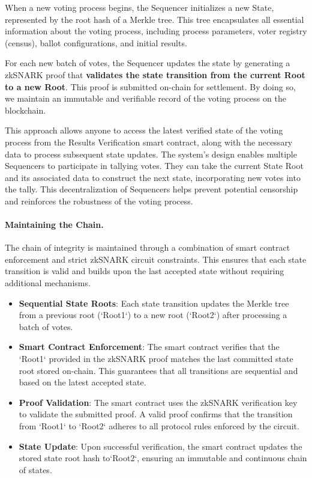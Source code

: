 When a new voting process begins, the Sequencer initializes a new State, represented by the root hash of a Merkle tree. This tree encapsulates all essential information about the voting process, including process parameters, voter registry (census), ballot configurations, and initial results.

For each new batch of votes, the Sequencer updates the state by generating a zkSNARK proof that \textbf{validates the state transition from the current Root to a new Root}. This proof is submitted on-chain for settlement. By doing so, we maintain an immutable and verifiable record of the voting process on the blockchain.

This approach allows anyone to access the latest verified state of the voting process from the Results Verification smart contract, along with the necessary data to process subsequent state updates. The system's design enables multiple Sequencers to participate in tallying votes. They can take the current State Root and its associated data to construct the next state, incorporating new votes into the tally. This decentralization of Sequencers helps prevent potential censorship and reinforces the robustness of the voting process.

\paragraph{Maintaining the Chain.}

The chain of integrity is maintained through a combination of smart contract enforcement and strict zkSNARK circuit constraints. This ensures that each state transition is valid and builds upon the last accepted state without requiring additional mechanisms.

\begin{itemize}
	\item \textbf{Sequential State Roots}: Each state transition updates the Merkle tree from a previous root (`Root1`) to a new root (`Root2`) after processing a batch of votes.
	\item \textbf{Smart Contract Enforcement}: The smart contract verifies that the `Root1` provided in the zkSNARK proof matches the last committed state root stored on-chain. This guarantees that all transitions are sequential and based on the latest accepted state.
	\item \textbf{Proof Validation}: The smart contract uses the zkSNARK verification key to validate the submitted proof. A valid proof confirms that the transition from `Root1` to `Root2` adheres to all protocol rules enforced by the circuit.
	\item \textbf{State Update}: Upon successful verification, the smart contract updates the stored state root hash to`Root2`, ensuring an immutable and continuous chain of states.
\end{itemize}

